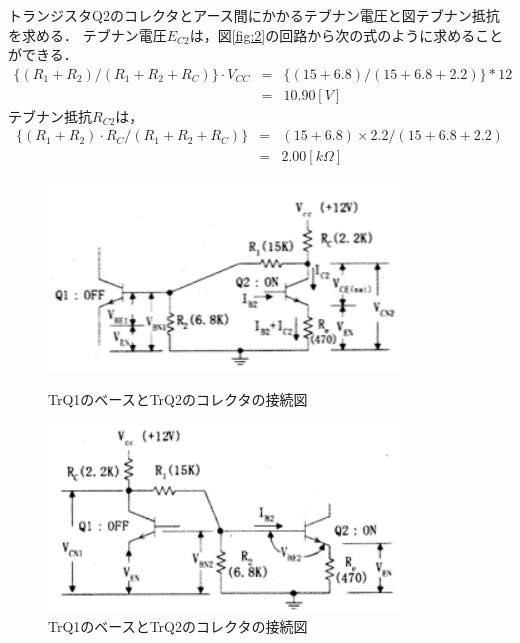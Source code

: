 \documentclass[10pt, a4j, dvipdfmx]{jarticle}
\begin{document}
    トランジスタQ2のコレクタとアース間にかかるテブナン電圧と図テブナン抵抗を求める．
    テブナン電圧$E_{C2}$は，図\ref{fig:2}の回路から次の式のように求めることができる．
    \begin{eqnarray}
        \{(R_1 + R_2) / (R_1 + R_2 + R_C)\} \cdot V_{CC} & = & \{(15 + 6.8) / (15 + 6.8 + 2.2)\} * 12 \nonumber \\  
        & = & 10.90 [V] \nonumber
    \end{eqnarray}
    テブナン抵抗$R_{C2}$は，
    \begin{eqnarray}
        \{(R_1 + R_2) \cdot R_C / (R_1 + R_2 + R_C) \} & = & (15 + 6.8) \times 2.2 / (15 + 6.8 + 2.2) \nonumber \\
        & = & 2.00 [k\Omega] \nonumber
    \end{eqnarray}

    \begin{figure}[H]
        \begin{minipage}{0.5\hsize}
            \centering
            \includegraphics[height=50mm]{images/fig-2.png}
            \caption{TrQ1のベースとTrQ2のコレクタの接続図}
            \label{fig:2}
        \end{minipage}
        \begin{minipage}{0.5\hsize}
            \centering
            \includegraphics[height=50mm]{images/fig-3.png}
            \caption{TrQ1のベースとTrQ2のコレクタの接続図}
            \label{fig:3}
        \end{minipage}
    \end{figure}
\end{document}
